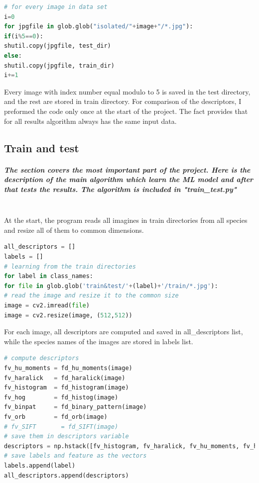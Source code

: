 \documentclass[12pt]{article}
\begin{document}
\begin{lstlisting}[language=Python]
# for every image in data set
i=0
for jpgfile in glob.glob("isolated/"+image+"/*.jpg"):
if(i%5==0):
shutil.copy(jpgfile, test_dir)
else:
shutil.copy(jpgfile, train_dir)
i+=1
\end{lstlisting}

Every image with index number equal modulo to 5 is saved in the test directory, and the rest are stored in train directory.
For comparison of the descriptors, I preformed the code only once at the start of the project. The fact provides that for all results algorithm always has the same input data.

\newpage

\subsection{Train and test}

\subparagraph{
The section covers the most important part of the project. Here is the description of the main algorithm which learn the ML model and after that tests the results. The algorithm is included in "train\_test.py" \\\\
}

At the start, the program reads all imagines in train directories from all species and resize all of them to common dimensions.

\begin{lstlisting}[language=Python]
all_descriptors = []
labels = []
# learning from the train directories
for label in class_names:
for file in glob.glob('train&test/'+(label)+'/train/*.jpg'):
# read the image and resize it to the common size
image = cv2.imread(file)
image = cv2.resize(image, (512,512))
\end{lstlisting}

For each image, all descriptors are computed and saved in all\_descriptors list, while the species names of the images are stored in labels list.

\begin{lstlisting}[language=Python]
# compute descriptors
fv_hu_moments = fd_hu_moments(image)
fv_haralick   = fd_haralick(image)
fv_histogram  = fd_histogram(image)
fv_hog        = fd_histog(image)
fv_binpat     = fd_binary_pattern(image)
fv_orb        = fd_orb(image)
# fv_SIFT       = fd_SIFT(image)  
# save them in descriptors variable
descriptors = np.hstack([fv_histogram, fv_haralick, fv_hu_moments, fv_hog, fv_binpat, fv_orb])
# save labels and feature as the vectors
labels.append(label)
all_descriptors.append(descriptors)
\end{lstlisting}
\end{document}
